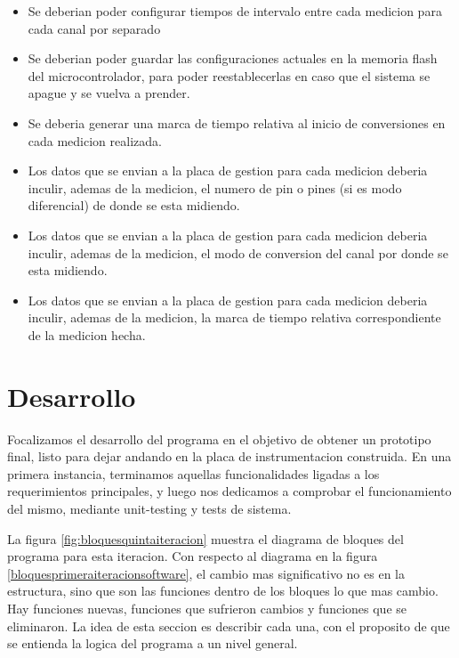 \begin{itemize}
\item Se deberian poder configurar tiempos de intervalo entre cada medicion para cada canal por separado
\item Se deberian poder guardar las configuraciones actuales en la memoria flash del microcontrolador, para poder reestablecerlas en caso que el sistema se apague y se vuelva a prender.
\item Se deberia generar una marca de tiempo relativa al inicio de conversiones en cada medicion realizada.
\item Los datos que se envian a la placa de gestion para cada medicion deberia inculir, ademas de la medicion, el numero de pin o pines (si es modo diferencial) de donde se esta midiendo. 
\item Los datos que se envian a la placa de gestion para cada medicion deberia inculir, ademas de la medicion, el modo de conversion del canal por donde se esta midiendo.
\item Los datos que se envian a la placa de gestion para cada medicion deberia inculir, ademas de la medicion, la marca de tiempo relativa correspondiente de la medicion hecha. 
\end{itemize}



\section{Desarrollo} %
\label{it5:sec:desarrollo}

Focalizamos el desarrollo del programa en el objetivo de obtener un prototipo final, listo para dejar andando en la placa de instrumentacion construida. En una primera instancia, terminamos aquellas funcionalidades ligadas a los requerimientos principales, y luego nos dedicamos a comprobar el funcionamiento del mismo, mediante unit-testing y tests de sistema.

La figura \ref{fig:bloquesquintaiteracion} muestra el diagrama de bloques del programa para esta iteracion. Con respecto al diagrama en la figura \ref{bloquesprimeraiteracionsoftware}, el cambio mas significativo no es en la estructura, sino que son las funciones dentro de los bloques lo que mas cambio. Hay funciones nuevas, funciones que sufrieron cambios y funciones que se eliminaron. La idea de esta seccion es describir cada una, con el proposito de que se entienda la logica del programa a un nivel general.

